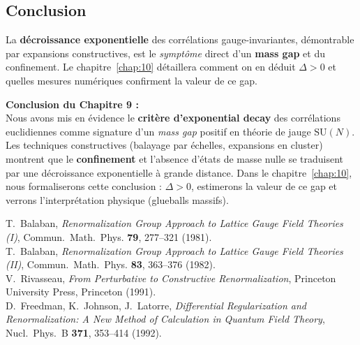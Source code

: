 \subsection*{Conclusion}
La \textbf{décroissance exponentielle} des corrélations gauge-invariantes, démontrable par expansions constructives, est le \emph{symptôme} direct d’un \textbf{mass gap} et du confinement. Le chapitre~\ref{chap:10} détaillera comment on en déduit \(\Delta>0\) et quelles mesures numériques confirment la valeur de ce gap.

\vspace{2em}

\noindent
\textbf{Conclusion du Chapitre 9 :}\\
Nous avons mis en évidence le \textbf{critère d’exponential decay} des corrélations euclidiennes comme signature d’un \emph{mass gap} positif en théorie de jauge \(\mathrm{SU}(N)\). Les techniques constructives (balayage par échelles, expansions en cluster) montrent que le \textbf{confinement} et l’absence d’états de masse nulle se traduisent par une décroissance exponentielle à grande distance.  
Dans le chapitre~\ref{chap:10}, nous formaliserons cette conclusion : \og \(\Delta > 0\)\fg, estimerons la valeur de ce gap et verrons l’interprétation physique (glueballs massifs).

\vspace{2em}

\begin{thebibliography}{99}
	
	T.~Balaban,
	\textit{Renormalization Group Approach to Lattice Gauge Field Theories (I)},
	Commun.~Math.~Phys. \textbf{79}, 277--321 (1981).
	\\[-0.75em]
	
	T.~Balaban,
	\textit{Renormalization Group Approach to Lattice Gauge Field Theories (II)},
	Commun.~Math.~Phys. \textbf{83}, 363--376 (1982).
	\\[-0.75em]
	
	V.~Rivasseau,
	\textit{From Perturbative to Constructive Renormalization},
	Princeton University Press, Princeton (1991).
	\\[-0.75em]
	
	D.~Freedman, K.~Johnson, J.~Latorre,
	\textit{Differential Regularization and Renormalization: A New Method of Calculation in Quantum Field Theory},
	Nucl.~Phys.~B \textbf{371}, 353--414 (1992).
	
\end{thebibliography}

